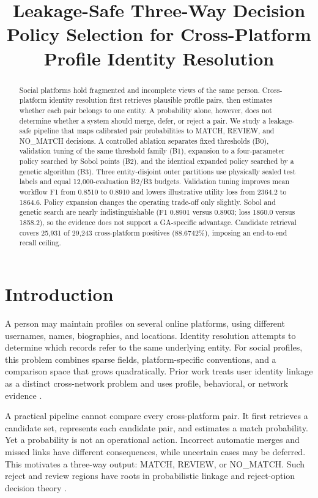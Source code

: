 \documentclass[conference]{IEEEtran}
\title{Leakage-Safe Three-Way Decision Policy Selection for Cross-Platform Profile Identity Resolution}
\author{\IEEEauthorblockN{Anonymous Submission}}
\begin{document}
\maketitle

\begin{abstract}
Social platforms hold fragmented and incomplete views of the same person. Cross-platform identity resolution first retrieves plausible profile pairs, then estimates whether each pair belongs to one entity. A probability alone, however, does not determine whether a system should merge, defer, or reject a pair. We study a leakage-safe pipeline that maps calibrated pair probabilities to MATCH, REVIEW, and NO\_MATCH decisions. A controlled ablation separates fixed thresholds (B0), validation tuning of the same threshold family (B1), expansion to a four-parameter policy searched by Sobol points (B2), and the identical expanded policy searched by a genetic algorithm (B3). Three entity-disjoint outer partitions use physically sealed test labels and equal 12,000-evaluation B2/B3 budgets. Validation tuning improves mean workflow F1 from 0.8510 to 0.8910 and lowers illustrative utility loss from 2364.2 to 1864.6. Policy expansion changes the operating trade-off only slightly. Sobol and genetic search are nearly indistinguishable (F1 0.8901 versus 0.8903; loss 1860.0 versus 1858.2), so the evidence does not support a GA-specific advantage. Candidate retrieval covers 25,931 of 29,243 cross-platform positives (88.6742\%), imposing an end-to-end recall ceiling.
\end{abstract}

\section{Introduction}
A person may maintain profiles on several online platforms, using different usernames, names, biographies, and locations. Identity resolution attempts to determine which records refer to the same underlying entity. For social profiles, this problem combines sparse fields, platform-specific conventions, and a comparison space that grows quadratically. Prior work treats user identity linkage as a distinct cross-network problem and uses profile, behavioral, or network evidence \cite{shu2017uilreview,linkSocial2018,yao2023profile}.

A practical pipeline cannot compare every cross-platform pair. It first retrieves a candidate set, represents each candidate pair, and estimates a match probability. Yet a probability is not an operational action. Incorrect automatic merges and missed links have different consequences, while uncertain cases may be deferred. This motivates a three-way output: MATCH, REVIEW, or NO\_MATCH. Such reject and review regions have roots in probabilistic linkage and reject-option decision theory \cite{fellegi1969theory,chow1970reject,ouyang2019threeway}.
\end{document}
